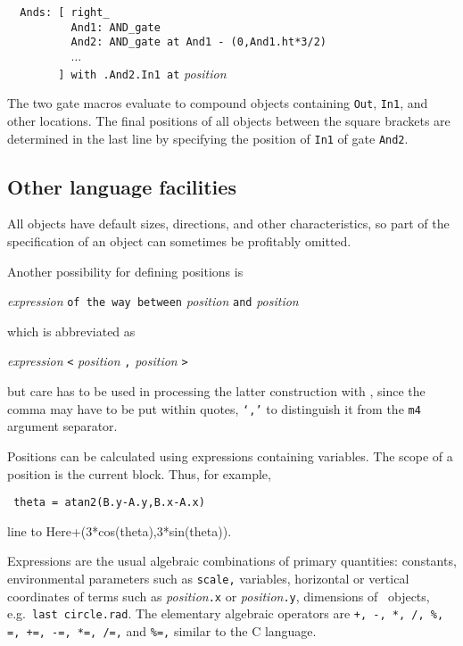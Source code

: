 \noindent%
\verb|  Ands: [ right_|\\
\verb|          And1: AND_gate|\\
\verb|          And2: AND_gate at And1 - (0,And1.ht*3/2)|\\
\verb|          |$\ldots$\\
\verb|        ] with .And2.In1 at| {\sl position} %

The two gate macros evaluate to compound objects containing {\tt Out},
{\tt In1}, and other locations.  The final positions of all objects
between the square brackets are determined in the last line by
specifying the position of {\tt In1} of gate {\tt And2}.

\subsection{Other language facilities}

All objects have default sizes, directions, and other characteristics,
so part of the specification of an object can sometimes be profitably
omitted.

Another possibility for defining positions is 

{\sl expression} {\tt of the way between} {\sl position}
 {\tt and} {\sl position}

\noindent%
which is abbreviated as

{\sl expression} {\tt <} {\sl position} {\tt ,} {\sl position} {\tt >}

\noindent%
but care has to be used in processing the latter construction with \Mfour,
since the comma may have to be put within quotes, {\tt `,'} to distinguish it
from the {\tt m4} argument separator.

Positions can be calculated using expressions containing variables.
The scope of a position is the current block.  Thus, for example,

{\tt
  theta = atan2(B.y-A.y,B.x-A.x)

  line to Here+(3*cos(theta),3*sin(theta)).
  }

Expressions are the usual algebraic combinations of primary quantities:
constants, environmental parameters such as {\tt scale,} variables,
horizontal or vertical coordinates of terms such as
{\sl position}{\tt.x} or {\sl position}{\tt.y},
dimensions of \pic\ objects, e.g.\ {\tt last circle.rad}.
The elementary algebraic operators are
{\tt +, -, *, /, \%, =, +=, -=, *=, /=,} and {\tt \%=,}
similar to the C language.

